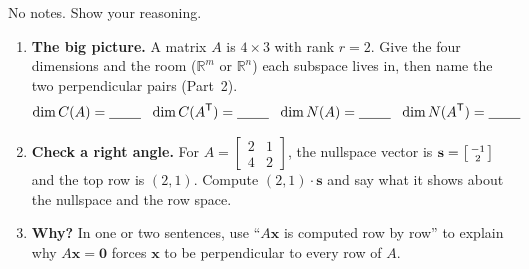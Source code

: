 \documentclass[10pt]{article}
\newcommand{\xx}{\mathbf{x}}
\newcommand{\svec}{\mathbf{s}}
\newcommand{\zero}{\mathbf{0}}
\newcommand{\T}{\mathsf{T}}
\begin{document}
\namedateperiod

\vspace{0.15in}

No notes. Show your reasoning.

\begin{enumerate}[leftmargin=1.8em, itemsep=15pt]
  \item \textbf{The big picture.} A matrix $A$ is $4\times 3$ with rank $r=2$. Give the four dimensions and
        the room ($\mathbb{R}^m$ or $\mathbb{R}^n$) each subspace lives in, then name the two perpendicular
        pairs (Part~2).
        \[
          \dim C(A)=\blank{0.8cm}\ \ \dim C(A^{\T})=\blank{0.8cm}\ \
          \dim N(A)=\blank{0.8cm}\ \ \dim N(A^{\T})=\blank{0.8cm}
        \]
  \item \textbf{Check a right angle.} For $A=\begin{bmatrix} 2 & 1 \\ 4 & 2 \end{bmatrix}$, the nullspace
        vector is $\svec=\begin{bsmallmatrix} -1\\2 \end{bsmallmatrix}$ and the top row is $(2,1)$. Compute
        $(2,1)\cdot\svec$ and say what it shows about the nullspace and the row space.
        \writelines{2}
  \item \textbf{Why?} In one or two sentences, use ``$A\xx$ is computed row by row'' to explain why
        $A\xx=\zero$ forces $\xx$ to be perpendicular to every row of $A$.
        \writelines{2}
\end{enumerate}
\end{document}
